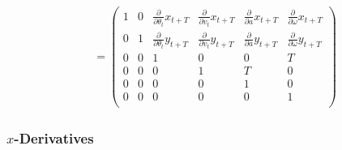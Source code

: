 \documentclass{article}
\begin{document}
\begin{align*}
    &=
    \begin{pmatrix}
        1 &
        0 &
        \frac{ \partial }{ \partial \theta_t } x_{t+T} &
        \frac{ \partial }{ \partial v_t } x_{t+T} &
        \frac{ \partial }{ \partial a } x_{t+T} & 
        \frac{ \partial }{ \partial \omega } x_{t+T} \\ 
        0 &
        1 &
        \frac{ \partial }{ \partial \theta_t } y_{t+T} &
        \frac{ \partial }{ \partial v_t } y_{t+T} &
        \frac{ \partial }{ \partial a } y_{t+T} & 
        \frac{ \partial }{ \partial \omega } y_{t+T} \\
        0 & 0 & 1 & 0 & 0 & T \\
        0 & 0 & 0 & 1 & T & 0 \\
        0 & 0 & 0 & 0 & 1 & 0 \\
        0 & 0 & 0 & 0 & 0 & 1 \\
    \end{pmatrix}
\end{align*}

\subsubsection{$x$-Derivatives}
\end{document}
